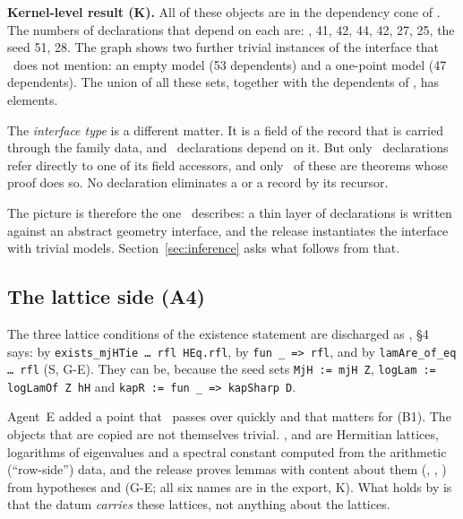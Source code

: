 \begin{verdictbox}
\textbf{Kernel-level result (K).} All of these objects are in the dependency cone of . The numbers of declarations that depend on each are:
 \NgeoDeg,  41,  42,  44,  42,  27,  25, the seed  51,  28.
The graph shows two further trivial instances of the interface that \N\ does not mention: an empty model  (53 dependents) and a one-point model  (47 dependents).
The union of all these sets, together with the dependents of , has \textbf{\Nflagged} elements.

The \emph{interface type}  is a different matter. It is a field of the record  that is carried through the family data, and \NifaceDeps\ declarations depend on it.
But only \NaccDirect\ declarations refer directly to one of its field accessors, and only \NaccThmProof\ of these are theorems whose proof does so. No declaration eliminates a  or a  record by its recursor.
\end{verdictbox}

The picture is therefore the one \N\ describes: a thin layer of declarations is written against an abstract geometry interface, and the release instantiates the interface with trivial models.
Section~\ref{sec:inference} asks what follows from that.

\subsection{The lattice side (A4)}


The three lattice conditions of the existence statement  are discharged as \N, \S4 says: by \texttt{exists\_mjHTie … rfl HEq.rfl}, by \texttt{fun \_ => rfl}, and by \texttt{lamAre\_of\_eq … rfl} (\textsf{S}, \textsf{G-E}).
They can be, because the seed sets \texttt{MjH := mjH Z}, \texttt{logLam := logLamOf Z hH} and \texttt{kapR := fun \_ => kapSharp D}.

Agent~E added a point that \N\ passes over quickly and that matters for (B1). The objects that are copied are not themselves trivial.
,  and  are Hermitian lattices, logarithms of eigenvalues and a spectral constant computed from the arithmetic (``row-side'') data,
and the release proves lemmas with content about them (, , ) from hypotheses  and  (\textsf{G-E}; all six names are in the export, \textsf{K}).
What holds by  is that the datum \emph{carries} these lattices, not anything about the lattices.

